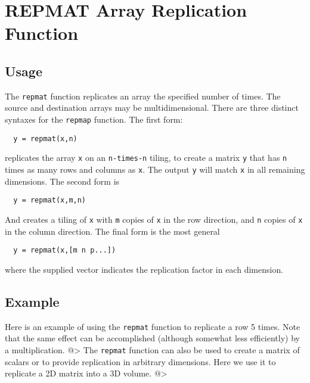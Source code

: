 \section{REPMAT Array Replication Function}

\subsection{Usage}

The \verb|repmat| function replicates an array the specified
number of times.  The source and destination arrays may
be multidimensional.  There are three distinct syntaxes for
the \verb|repmap| function.  The first form:
\begin{verbatim}
  y = repmat(x,n)
\end{verbatim}
replicates the array \verb|x| on an \verb|n-times-n| tiling, to create
a matrix \verb|y| that has \verb|n| times as many rows and columns
as \verb|x|.  The output \verb|y| will match \verb|x| in all remaining
dimensions.  The second form is
\begin{verbatim}
  y = repmat(x,m,n)
\end{verbatim}
And creates a tiling of \verb|x| with \verb|m| copies of \verb|x| in the
row direction, and \verb|n| copies of \verb|x| in the column direction.
The final form is the most general
\begin{verbatim}
  y = repmat(x,[m n p...])
\end{verbatim}
where the supplied vector indicates the replication factor in 
each dimension.  
\subsection{Example}

Here is an example of using the \verb|repmat| function to replicate
a row 5 times.  Note that the same effect can be accomplished
(although somewhat less efficiently) by a multiplication.
@>
The \verb|repmat| function can also be used to create a matrix of scalars
or to provide replication in arbitrary dimensions.  Here we use it to
replicate a 2D matrix into a 3D volume.
@>
